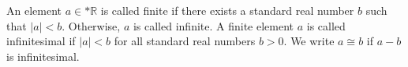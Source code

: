 An element $a \in *\mathbb{R}$ is called finite if there exists a standard real number $b$ such that $|a| < b$. Otherwise, $a$ is called infinite. A finite element $a$ is called infinitesimal if $|a| < b$ for all standard real numbers $b > 0$. We write $a \cong b$ if $a - b$ is infinitesimal.
